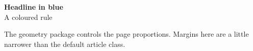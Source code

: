 \documentclass{article}
\begin{document}
\begin{center}
{\bfseries\large Headline in blue} \\
{\color{accent} A coloured rule} \\
\end{center}
The geometry package controls the page proportions. Margins here
are a little narrower than the default article class.
\end{document}
